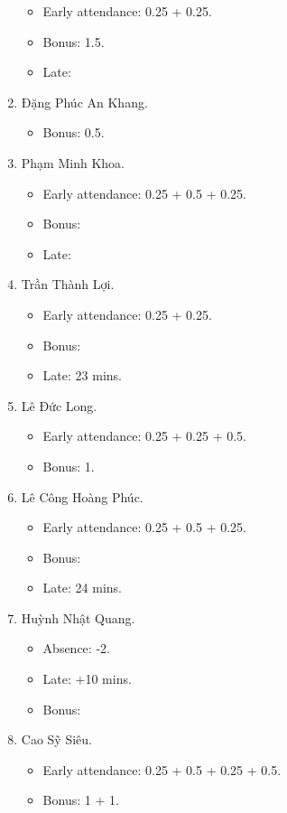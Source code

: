 \documentclass{article}
\begin{document}
\begin{enumerate}
	\begin{itemize}
		\item Early attendance: 0.25 + 0.25.
		\item Bonus: 1.5.
		\item Late: 
	\end{itemize}
	\item {\sc Đặng Phúc An Khang.}
	\begin{itemize}
		\item Bonus: 0.5.
	\end{itemize}
	\item {\sc Phạm Minh Khoa.}
	\begin{itemize}
		\item Early attendance: 0.25 + 0.5 + 0.25.
		\item Bonus:
		\item Late: 
	\end{itemize}
	\item {\sc Trần Thành Lợi.}
	\begin{itemize}
		\item Early attendance: 0.25 + 0.25.
		\item Bonus: 
		\item Late: 23 mins.
	\end{itemize}
	\item {\sc Lê Đức Long.}
	\begin{itemize}
		\item Early attendance: 0.25 + 0.25 + 0.5.
		\item Bonus: 1.
	\end{itemize}
	\item {\sc Lê Công Hoàng Phúc.}
	\begin{itemize}
		\item Early attendance: 0.25 + 0.5 + 0.25.
		\item Bonus: 
		\item Late: 24 mins.
	\end{itemize}
	\item {\sc Huỳnh Nhật Quang.}
	\begin{itemize}
		\item Absence: -2.
		\item Late: +10 mins.
		\item Bonus: 
	\end{itemize}
	\item {\sc Cao Sỹ Siêu.}
	\begin{itemize}
		\item Early attendance: 0.25 + 0.5 + 0.25 + 0.5.
		\item Bonus: 1 + 1.

\end{itemize}
\end{enumerate}
\end{document}
